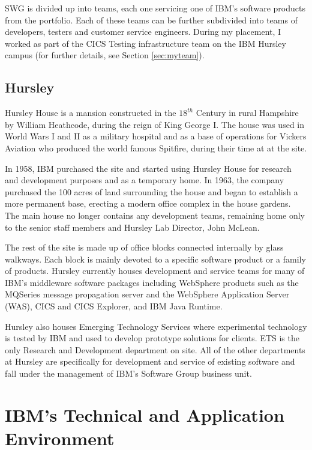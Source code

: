 \documentclass[12pt,a4paper]{article}
\begin{document}
SWG is divided up into teams, each one servicing one of IBM’s software products
from the portfolio. Each of these teams can be further subdivided into teams of
developers, testers and customer service engineers. During my placement, I
worked as part of the CICS Testing infrastructure team on the IBM Hursley campus
(for further details, see Section \ref{sec:myteam}).

\subsection{Hursley}
Hursley House is a mansion constructed in the $18^{th}$ Century in rural
Hampshire by William Heathcode, during the reign of King George I. The house was
used in World Wars I and II as a military hospital and as a base of operations
for Vickers Aviation who produced the world famous Spitfire, during their time
at at the site.

In 1958, IBM purchased the site and started using Hursley House for research and
development purposes and as a temporary home. In 1963, the company purchased the
100 acres of land surrounding the house and began to establish a more permanent
base, erecting a modern office complex in the house gardens. The main house no
longer contains any development teams, remaining home only to the senior staff
members and Hursley Lab Director, John McLean.

The rest of the site is made up of office blocks connected internally by glass
walkways. Each block is mainly devoted to a specific software product or a
family of products. Hursley currently houses development and service teams for
many of IBM’s middleware software packages including WebSphere products such as
the MQSeries message propagation server and the WebSphere Application Server
(WAS), CICS and CICS Explorer, and IBM Java Runtime.

Hursley also houses Emerging Technology Services where experimental technology
is tested by IBM and used to develop prototype solutions for clients. ETS is the
only Research and Development department on site. All of the other departments
at Hursley are specifically for development and service of existing software and
fall under the management of IBM’s Software Group business unit.

\section{IBM's Technical and Application Environment}
\end{document}
